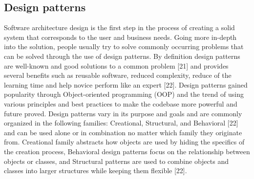 \documentclass{article}
\begin{document}
\begin{multicols}{2}
\subsection{Design patterns}
Software architecture design is the first step in the process of creating a solid system that corresponds to the user and business needs. Going more in-depth into the solution, people usually try to solve commonly occurring problems that can be solved through the use of design patterns. By definition design patterns are well-known and good solutions to a common problem [21] and provides several benefits such as reusable software, reduced complexity, reduce of the learning time and help novice perform like an expert [22]. Design patterns gained popularity through Object-oriented programming (OOP) and the trend of using various principles and best practices to make the codebase more powerful and future proved. Design patterns vary in its purpose and goals and are commonly organized in the following families: Creational, Structural, and Behavioral [22] and can be used alone or in combination no matter which family they originate from. Creational family abstracts how objects are used by hiding the specifics of the creation process, Behavioral design patterns focus on the relationship between objects or classes, and Structural patterns are used to combine objects and classes into larger structures while keeping them flexible [22]. 


\end{multicols}
\end{document}
